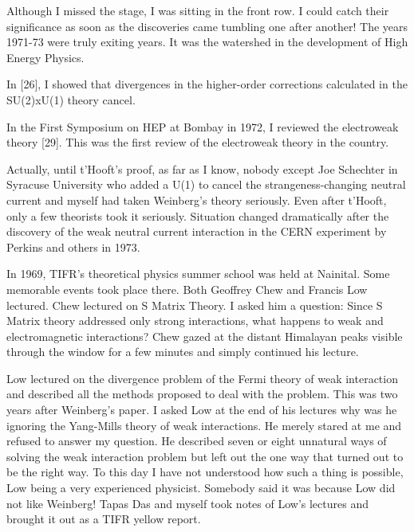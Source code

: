Although I missed the stage, I was sitting in the front row. I could 
catch their significance as soon as the discoveries came tumbling one 
after another! The years 1971-73 were truly exiting years. It was the 
watershed in the development of High Energy Physics.

In [26], I showed that divergences in the higher-order corrections 
calculated in the SU(2)xU(1) theory cancel.

In the First Symposium on HEP at Bombay in 1972, I reviewed the 
electroweak theory [29]. This was the first review of the electroweak 
theory in the country.
 
Actually, until t'Hooft's proof, as far as I know, nobody except Joe 
Schechter in Syracuse University who added a U(1) to cancel the 
strangeness-changing neutral current and myself had taken Weinberg's 
theory seriously. Even after t'Hooft, only a few theorists took it 
seriously. Situation changed dramatically after the discovery of the 
weak neutral current interaction in the CERN experiment by Perkins and 
others in 1973.

In 1969, TIFR's theoretical physics summer school was held at Nainital. 
Some memorable events took place there. Both Geoffrey Chew and Francis 
Low lectured. Chew lectured on S Matrix Theory. I asked him a question: 
Since S Matrix theory addressed only strong interactions, what happens 
to weak and electromagnetic interactions? Chew gazed at the distant 
Himalayan peaks visible through the window for a few minutes and simply 
continued his lecture.

Low lectured on the divergence problem of the Fermi theory of weak 
interaction and described all the methods proposed to deal with the 
problem. This was two years after Weinberg's paper. I asked Low at the 
end of his lectures why was he ignoring the Yang-Mills theory of weak 
interactions. He merely stared at me and refused to answer my question. 
He described seven or eight unnatural ways of solving the weak 
interaction problem but left out the one way that turned out to be the 
right way. To this day I have not understood how such a thing is 
possible, Low being a very experienced physicist. Somebody said it was 
because Low did not like Weinberg! Tapas Das and myself took notes of 
Low's lectures and brought it out as a TIFR yellow report.

